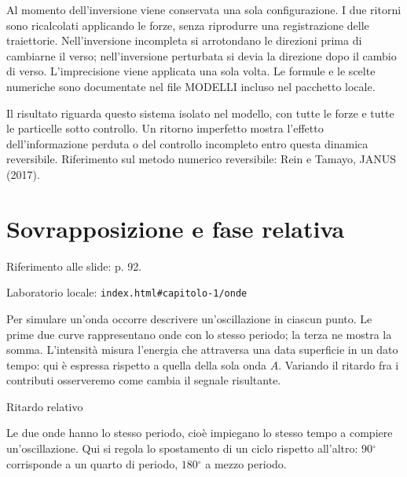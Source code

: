 Al momento dell'inversione viene conservata una sola configurazione. I due ritorni sono ricalcolati applicando le forze, senza riprodurre una registrazione delle traiettorie. Nell'inversione incompleta si arrotondano le direzioni prima di cambiarne il verso; nell'inversione perturbata si devia la direzione dopo il cambio di verso. L'imprecisione viene applicata una sola volta. Le formule e le scelte numeriche sono documentate nel file MODELLI incluso nel pacchetto locale.\par

Il risultato riguarda questo sistema isolato nel modello, con tutte le forze e tutte le particelle sotto controllo. Un ritorno imperfetto mostra l'effetto dell'informazione perduta o del controllo incompleto entro questa dinamica reversibile. Riferimento sul metodo numerico reversibile: Rein e Tamayo, JANUS (2017).\par




\Needspace{.43\textheight}
\section{Sovrapposizione e fase relativa}
\label{c1-onde}

{\sffamily\small\color{Ink!70} Riferimento alle slide: p. 92.\par}

{\sffamily\small\color{Ink!70} Laboratorio locale: \nolinkurl{index.html#capitolo-1/onde}\par}

Per simulare un'onda occorre descrivere un'oscillazione in ciascun punto. Le prime due curve rappresentano onde con lo stesso periodo; la terza ne mostra la somma. L'intensità misura l'energia che attraversa una data superficie in un dato tempo: qui è espressa rispetto a quella della sola onda \(A\). Variando il ritardo fra i contributi osserveremo come cambia il segnale risultante.\par



Ritardo relativo\par

Le due onde hanno lo stesso periodo, cioè impiegano lo stesso tempo a compiere un'oscillazione. Qui si regola lo spostamento di un ciclo rispetto all'altro: \(90{}^{\circ} \) corrisponde a un quarto di periodo, \(180{}^{\circ} \) a mezzo periodo.\par

